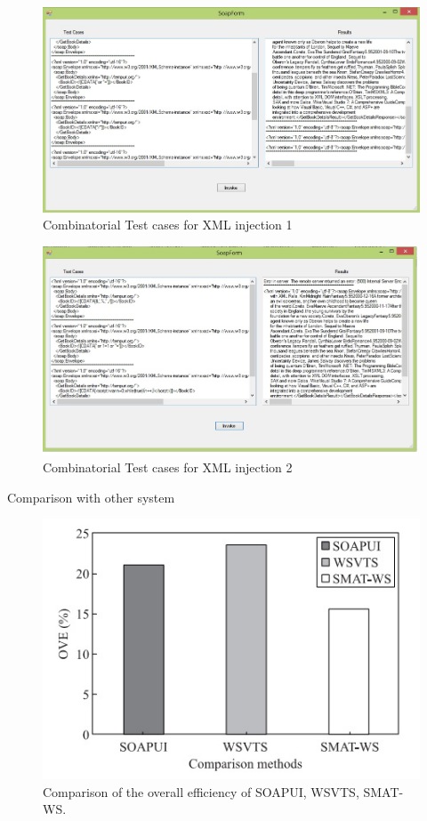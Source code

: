 \documentclass{bredelebeamer}
\begin{document}
\begin{frame}
\begin{figure}
\centering
\includegraphics[width=0.7\linewidth]{images/WS/Fig8}
\caption{Combinatorial Test cases for XML injection 1}
\label{fig:Fig8}
\end{figure}

\end{frame}

\begin{frame}
\begin{figure}
\centering
\includegraphics[width=0.7\linewidth]{images/WS/Mut1}
\caption{Combinatorial Test cases for XML injection 2}
\label{fig:Mut1}
\end{figure}

\end{frame}

\begin{frame}{Comparison with other system}

\begin{figure}
\centering
\includegraphics[width=0.7\linewidth]{images/WS/Fig11}
\caption{Comparison of the overall efficiency of SOAPUI, WSVTS, SMAT-WS.}
\label{fig:Fig11}
\end{figure}

\end{frame}
\end{document}
